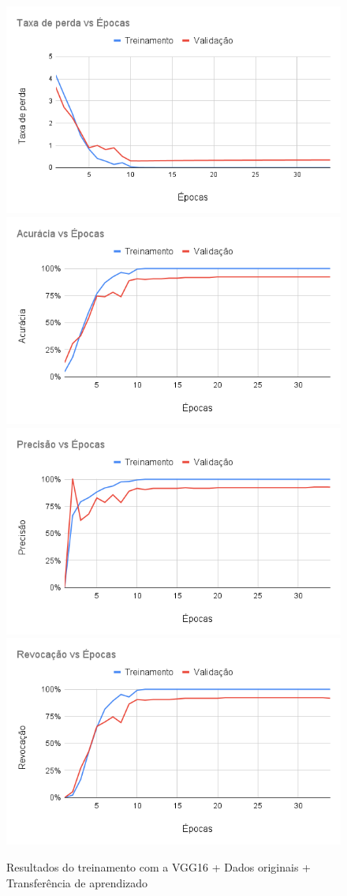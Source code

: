 \documentclass[
	12pt,				%
	oneside,			%
	a4paper,			%
	english,			%
	brazil				%
	]{abntex2ppgsi}
\begin{document}
\begin{figure}[H]
    \centering
    \caption{Resultados do treinamento com a VGG16 + Dados originais + Transferência de aprendizado}
    \includegraphics[width=.50\textwidth]{imagens/resultados_discussao/architecture/vgg_16/transfer_learning/original/perda.png}\hfill
    \includegraphics[width=.50\textwidth]{imagens/resultados_discussao/architecture/vgg_16/transfer_learning/original/acuracia.png}\bigbreak    \includegraphics[width=.50\textwidth]{imagens/resultados_discussao/architecture/vgg_16/transfer_learning/original/precisao.png}\hfill
    \includegraphics[width=.50\textwidth]{imagens/resultados_discussao/architecture/vgg_16/transfer_learning/original/revocacao.png}
    \label{fig:vgg_16_original_transferencia_aprendizado}
\end{figure}
\end{document}
